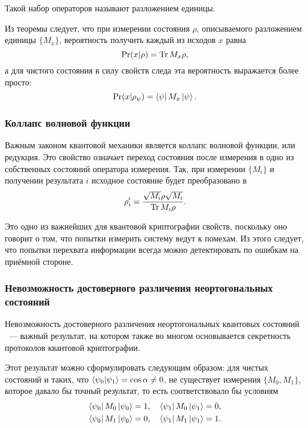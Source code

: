 Такой набор операторов называют разложением единицы.

Из теоремы следует, что при измерении состояния $\rho$, описываемого разложением единицы $\{M_x\}$, вероятность получить каждый из исходов $x$ равна
\begin{equation} \operatorname{Pr}(x|\rho) = \operatorname{Tr} M_x \rho, \end{equation}
а для чистого состояния \state{\psi} в силу свойств следа эта вероятность выражается более просто:
\begin{equation} \operatorname{Pr}(x|\rho_\psi) = \left\langle \psi \right| M_x \left| \psi \right\rangle. \end{equation}

\subsubsection{Коллапс волновой функции}
Важным законом квантовой механики является коллапс волновой функции, или редукция. Это свойство означает переход состояния после измерения в одно из собственных состояний оператора измерения. Так, при измерении $\{M_i\}$ и получении результата $i$ исходное состояние будет преобразовано в 
\begin{equation} \rho'_i = \frac{\sqrt{M_i} \rho \sqrt{M_i}}{\operatorname{Tr} M_i \rho}. \end{equation}

Это одно из важнейших для квантовой криптографии свойств, поскольку оно говорит о том, что попытки измерить систему ведут к помехам. Из этого следует, что попытки перехвата информации всегда можно детектировать по ошибкам на приёмной стороне.

\subsubsection{Невозможность достоверного различения неортогональных состояний}\label{no_discrimination_theorem}
Невозможность достоверного различения неортогональных квантовых состояний \cite{non_orthogonal_states_discrimination_theorem}~--- важный результат, на котором также во многом основывается секретность протоколов квантовой криптографии.

Этот результат можно сформулировать следующим образом: для чистых состояний  и  таких, что
$\left\langle \psi_0|\psi_1\right\rangle = \cos \alpha \neq 0$, не существует измерения $\{M_0, M_1\}$, которое давало бы точный результат, то есть соответствовало бы условиям
\begin{eqnarray}\label{measurement_operators_conditions}
  \left\langle \psi_0 \right| M_0 \left| \psi_0 \right\rangle = 1,\quad \left\langle \psi_1 \right| M_0 \left| \psi_1 \right\rangle = 0, \nonumber\\
  \left\langle \psi_0 \right| M_1 \left| \psi_0 \right\rangle = 0,\quad \left\langle \psi_1 \right| M_1 \left| \psi_1 \right\rangle = 1.
\end{eqnarray}

